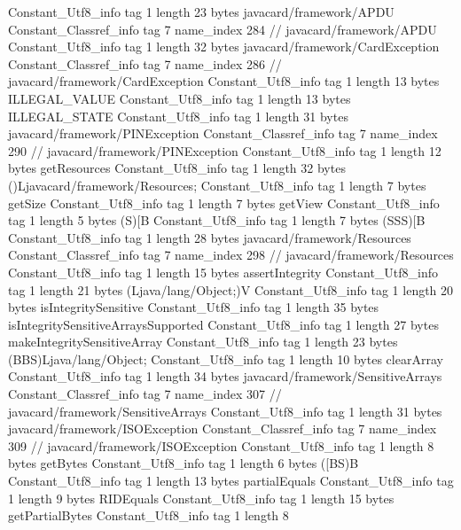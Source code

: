 {{{		}
		Constant_Utf8_info {
			tag	1
			length	23
			bytes	javacard/framework/APDU
		}
		Constant_Classref_info {
			tag	7
			name_index	284		// javacard/framework/APDU
		}
		Constant_Utf8_info {
			tag	1
			length	32
			bytes	javacard/framework/CardException
		}
		Constant_Classref_info {
			tag	7
			name_index	286		// javacard/framework/CardException
		}
		Constant_Utf8_info {
			tag	1
			length	13
			bytes	ILLEGAL_VALUE
		}
		Constant_Utf8_info {
			tag	1
			length	13
			bytes	ILLEGAL_STATE
		}
		Constant_Utf8_info {
			tag	1
			length	31
			bytes	javacard/framework/PINException
		}
		Constant_Classref_info {
			tag	7
			name_index	290		// javacard/framework/PINException
		}
		Constant_Utf8_info {
			tag	1
			length	12
			bytes	getResources
		}
		Constant_Utf8_info {
			tag	1
			length	32
			bytes	()Ljavacard/framework/Resources;
		}
		Constant_Utf8_info {
			tag	1
			length	7
			bytes	getSize
		}
		Constant_Utf8_info {
			tag	1
			length	7
			bytes	getView
		}
		Constant_Utf8_info {
			tag	1
			length	5
			bytes	(S)[B
		}
		Constant_Utf8_info {
			tag	1
			length	7
			bytes	(SSS)[B
		}
		Constant_Utf8_info {
			tag	1
			length	28
			bytes	javacard/framework/Resources
		}
		Constant_Classref_info {
			tag	7
			name_index	298		// javacard/framework/Resources
		}
		Constant_Utf8_info {
			tag	1
			length	15
			bytes	assertIntegrity
		}
		Constant_Utf8_info {
			tag	1
			length	21
			bytes	(Ljava/lang/Object;)V
		}
		Constant_Utf8_info {
			tag	1
			length	20
			bytes	isIntegritySensitive
		}
		Constant_Utf8_info {
			tag	1
			length	35
			bytes	isIntegritySensitiveArraysSupported
		}
		Constant_Utf8_info {
			tag	1
			length	27
			bytes	makeIntegritySensitiveArray
		}
		Constant_Utf8_info {
			tag	1
			length	23
			bytes	(BBS)Ljava/lang/Object;
		}
		Constant_Utf8_info {
			tag	1
			length	10
			bytes	clearArray
		}
		Constant_Utf8_info {
			tag	1
			length	34
			bytes	javacard/framework/SensitiveArrays
		}
		Constant_Classref_info {
			tag	7
			name_index	307		// javacard/framework/SensitiveArrays
		}
		Constant_Utf8_info {
			tag	1
			length	31
			bytes	javacard/framework/ISOException
		}
		Constant_Classref_info {
			tag	7
			name_index	309		// javacard/framework/ISOException
		}
		Constant_Utf8_info {
			tag	1
			length	8
			bytes	getBytes
		}
		Constant_Utf8_info {
			tag	1
			length	6
			bytes	([BS)B
		}
		Constant_Utf8_info {
			tag	1
			length	13
			bytes	partialEquals
		}
		Constant_Utf8_info {
			tag	1
			length	9
			bytes	RIDEquals
		}
		Constant_Utf8_info {
			tag	1
			length	15
			bytes	getPartialBytes
		}
		Constant_Utf8_info {
			tag	1
			length	8
}}}
